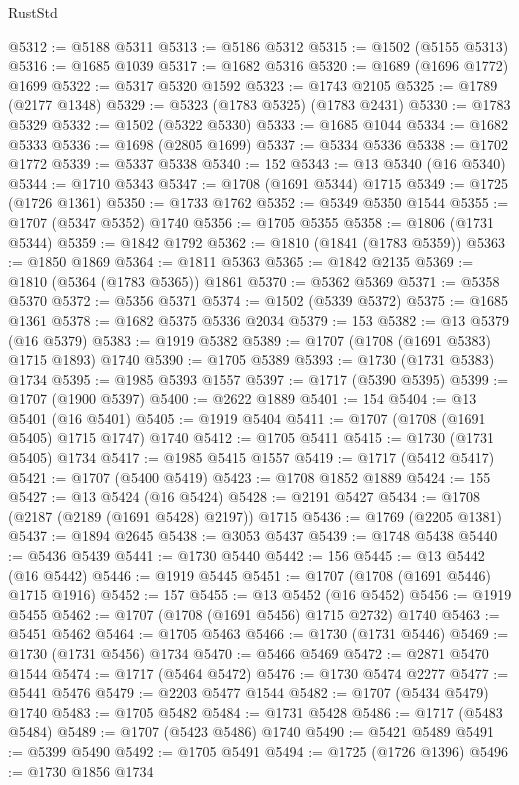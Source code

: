 \begin{lexlean}{RustStd}
\begin{coremodule}
@5312 := @5188 @5311
@5313 := @5186 @5312
@5315 := @1502 (@5155 @5313)
@5316 := @1685 @1039
@5317 := @1682 @5316
@5320 := @1689 (@1696 @1772) @1699
@5322 := @5317 @5320 @1592
@5323 := @1743 @2105
@5325 := @1789 (@2177 @1348)
@5329 := @5323 (@1783 @5325) (@1783 @2431)
@5330 := @1783 @5329
@5332 := @1502 (@5322 @5330)
@5333 := @1685 @1044
@5334 := @1682 @5333
@5336 := @1698 (@2805 @1699)
@5337 := @5334 @5336
@5338 := @1702 @1772
@5339 := @5337 @5338
@5340 := 152
@5343 := @13 @5340 (@16 @5340)
@5344 := @1710 @5343
@5347 := @1708 (@1691 @5344) @1715
@5349 := @1725 (@1726 @1361)
@5350 := @1733 @1762
@5352 := @5349 @5350 @1544
@5355 := @1707 (@5347 @5352) @1740
@5356 := @1705 @5355
@5358 := @1806 (@1731 @5344)
@5359 := @1842 @1792
@5362 := @1810 (@1841 (@1783 @5359))
@5363 := @1850 @1869
@5364 := @1811 @5363
@5365 := @1842 @2135
@5369 := @1810 (@5364 (@1783 @5365)) @1861
@5370 := @5362 @5369
@5371 := @5358 @5370
@5372 := @5356 @5371
@5374 := @1502 (@5339 @5372)
@5375 := @1685 @1361
@5378 := @1682 @5375 @5336 @2034
@5379 := 153
@5382 := @13 @5379 (@16 @5379)
@5383 := @1919 @5382
@5389 := @1707 (@1708 (@1691 @5383) @1715 @1893) @1740
@5390 := @1705 @5389
@5393 := @1730 (@1731 @5383) @1734
@5395 := @1985 @5393 @1557
@5397 := @1717 (@5390 @5395)
@5399 := @1707 (@1900 @5397)
@5400 := @2622 @1889
@5401 := 154
@5404 := @13 @5401 (@16 @5401)
@5405 := @1919 @5404
@5411 := @1707 (@1708 (@1691 @5405) @1715 @1747) @1740
@5412 := @1705 @5411
@5415 := @1730 (@1731 @5405) @1734
@5417 := @1985 @5415 @1557
@5419 := @1717 (@5412 @5417)
@5421 := @1707 (@5400 @5419)
@5423 := @1708 @1852 @1889
@5424 := 155
@5427 := @13 @5424 (@16 @5424)
@5428 := @2191 @5427
@5434 := @1708 (@2187 (@2189 (@1691 @5428) @2197)) @1715
@5436 := @1769 (@2205 @1381)
@5437 := @1894 @2645
@5438 := @3053 @5437
@5439 := @1748 @5438
@5440 := @5436 @5439
@5441 := @1730 @5440
@5442 := 156
@5445 := @13 @5442 (@16 @5442)
@5446 := @1919 @5445
@5451 := @1707 (@1708 (@1691 @5446) @1715 @1916)
@5452 := 157
@5455 := @13 @5452 (@16 @5452)
@5456 := @1919 @5455
@5462 := @1707 (@1708 (@1691 @5456) @1715 @2732) @1740
@5463 := @5451 @5462
@5464 := @1705 @5463
@5466 := @1730 (@1731 @5446)
@5469 := @1730 (@1731 @5456) @1734
@5470 := @5466 @5469
@5472 := @2871 @5470 @1544
@5474 := @1717 (@5464 @5472)
@5476 := @1730 @5474 @2277
@5477 := @5441 @5476
@5479 := @2203 @5477 @1544
@5482 := @1707 (@5434 @5479) @1740
@5483 := @1705 @5482
@5484 := @1731 @5428
@5486 := @1717 (@5483 @5484)
@5489 := @1707 (@5423 @5486) @1740
@5490 := @5421 @5489
@5491 := @5399 @5490
@5492 := @1705 @5491
@5494 := @1725 (@1726 @1396)
@5496 := @1730 @1856 @1734

\end{coremodule}
\end{lexlean}

